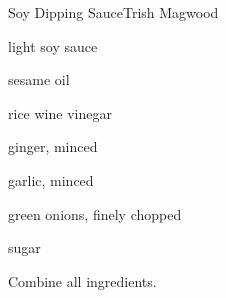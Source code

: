 \begin{recipe}{Soy Dipping Sauce}{Trish Magwood}{}

\begin{ingredients}
\item \C{\half} light soy sauce
\item {} sesame oil 
\item {} rice wine vinegar
\item \Tp{\half} ginger, minced
\item \Tp{\half} garlic, minced
\item \Tp{1\half} green onions, finely chopped
\item \Tp{\half} sugar
\end{ingredients}

\begin{directions}
\item Combine all ingredients.
\end{directions}

\end{recipe}
